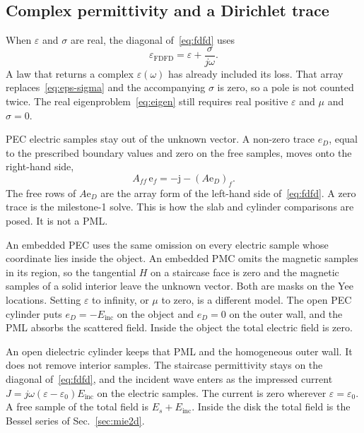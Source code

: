 \documentclass[11pt,a4paper]{article}
\numberwithin{equation}{section}
\begin{document}
\subsection{Complex permittivity and a Dirichlet trace}
\label{sec:dirichlet}

When $\varepsilon$ and $\sigma$ are real, the diagonal of~\eqref{eq:fdfd} uses
\begin{equation}
\varepsilon_{\mathrm{FDFD}} = \varepsilon + \frac{\sigma}{j\omega}.
\label{eq:eps-sigma}
\end{equation}
A law that returns a complex $\varepsilon(\omega)$ has already included its
loss. That array replaces~\eqref{eq:eps-sigma} and the accompanying $\sigma$
is zero, so a pole is not counted twice. The real eigenproblem~\eqref{eq:eigen}
still requires real positive $\varepsilon$ and $\mu$ and $\sigma=0$.

PEC electric samples stay out of the unknown vector. A non-zero trace $e_D$,
equal to the prescribed boundary values and zero on the free samples, moves
onto the right-hand side,
\begin{equation}
A_{ff}\,\mathrm{e}_f = -\mathrm{j} - (A\mathrm{e}_D)_f.
\label{eq:dirichlet}
\end{equation}
The free rows of $A\mathrm{e}_D$ are the array form of the left-hand side
of~\eqref{eq:fdfd}. A zero trace is the milestone-1 solve. This is how the
slab and cylinder comparisons are posed. It is not a PML.

An embedded PEC uses the same omission on every electric sample whose
coordinate lies inside the object. An embedded PMC omits the magnetic
samples in its region, so the tangential $H$ on a staircase face is zero
and the magnetic samples of a solid interior leave the unknown vector.
Both are masks on the Yee locations. Setting $\varepsilon$ to infinity, or
$\mu$ to zero, is a different model. The open PEC cylinder puts
$e_D=-E_{\mathrm{inc}}$ on the object and $e_D=0$ on the outer wall, and
the PML absorbs the scattered field. Inside the object the total electric
field is zero.

An open dielectric cylinder keeps that PML and the homogeneous outer wall.
It does not remove interior samples. The staircase permittivity stays on
the diagonal of~\eqref{eq:fdfd}, and the incident wave enters as the
impressed current $J=j\omega(\varepsilon-\varepsilon_0)E_{\mathrm{inc}}$
on the electric samples. The current is zero wherever
$\varepsilon=\varepsilon_0$. A free sample of the total field is
$E_s+E_{\mathrm{inc}}$. Inside the disk the total field is the Bessel
series of Sec.~\ref{sec:mie2d}.
\end{document}

